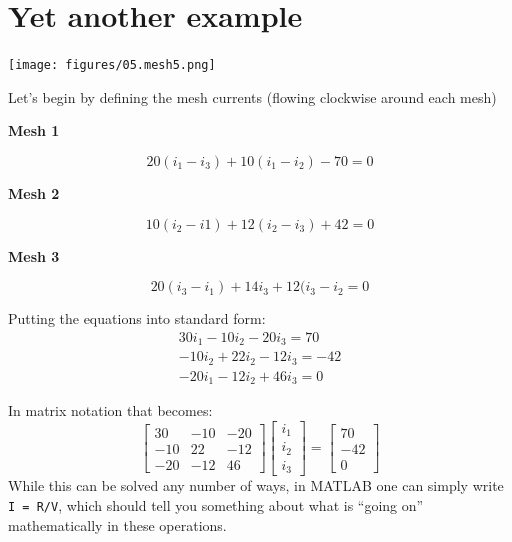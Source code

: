 \documentclass[11pt]{book}
\begin{document}
\section{Yet another example}
\begin{center}
	\texttt{[image: figures/05.mesh5.png]}
\end{center}
Let's begin by defining the mesh currents (flowing clockwise around each mesh)

\begin{center}
	\textbf{Mesh 1}
\end{center}
\begin{equation}
	20(i_1 - i_3) + 10(i_1 - i_2) - 70 = 0
\end{equation}

\begin{center}
	\textbf{Mesh 2}
\end{center}
\begin{equation}
	10(i_2 - i1) + 12(i_2 - i_3) + 42 = 0
\end{equation}

\begin{center}
	\textbf{Mesh 3}
\end{center}
\begin{equation}
	20(i_3 - i_1) + 14i_3 + 12(i_3 - i_2 = 0
\end{equation}

Putting the equations into standard form:
\begin{eqnarray}
	30i_1 - 10i_2 - 20i_3 = 70 \\
	-10 i_2 +22 i_2 - 12 i_3 = -42 \\
	-20 i_1 - 12i_2 +46 i_3 = 0
\end{eqnarray}

In matrix notation that becomes:
\begin{equation}
	\begin{bmatrix}
		30 & -10 & -20 \\ -10 & 22 & -12 \\ -20 & -12 & 46
	\end{bmatrix}
	\begin{bmatrix}
		i_1 \\ i_2 \\ i_3
	\end{bmatrix}
	=
	\begin{bmatrix}
		70 \\ -42 \\ 0
	\end{bmatrix}
\end{equation}
While this can be solved any number of ways, in MATLAB one can simply write \texttt{I = R/V}, which should tell you something about what is ``going on'' mathematically in these operations.
\end{document}
